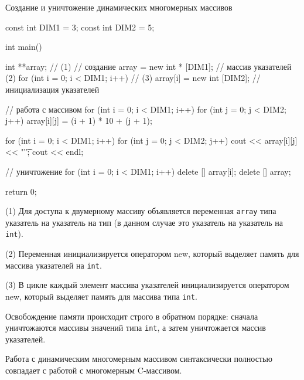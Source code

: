 \documentclass[
    9pt,
    hyperref={pdfencoding=unicode}
    ]{beamer}
\theoremstyle{definition}
\begin{document}
\begin{frame}[fragile]{Создание и уничтожение динамических многомерных массивов}
	\scriptsize 
	\begin{cppcode}
		const int DIM1 = 3;
		const int DIM2 = 5;
		
		int main() {			
			int **array;    // (1)			
			// создание
			array = new int * [DIM1]; // массив указателей (2)
			for (int i = 0; i < DIM1; i++) { // (3)
				array[i] = new int [DIM2]; // инициализация указателей
			}
			
			// работа с массивом
			for (int i = 0; i < DIM1; i++) {
				for (int j = 0; j < DIM2; j++) {
					array[i][j] = (i + 1) * 10 + (j + 1);
				}
			}
			
			for (int i = 0; i < DIM1; i++) {
				for (int j = 0; j < DIM2; j++) {
					cout << array[i][j] << "\t";
				}
				cout << endl;
			}
			
			// уничтожение
			for (int i = 0; i < DIM1; i++) {
				delete [] array[i];
			}
			delete [] array;
			
			return 0;
		}
	\end{cppcode}
\end{frame}

\begin{frame}
	(1) Для доступа к двумерному массиву объявляется переменная \texttt{array} типа указатель на указатель на тип (в данном случае это указатель на указатель на \texttt{int}).
	
	(2) Переменная инициализируется оператором new, который выделяет память для массива указателей на \texttt{int}.
	
	(3) В цикле каждый элемент массива указателей инициализируется оператором new, который выделяет память для массива типа \texttt{int}.
	
	Освобождение памяти происходит строго в обратном порядке: сначала уничтожаются массивы значений типа \texttt{int}, а затем уничтожается массив указателей.
	
	Работа с динамическим многомерным массивом синтаксически полностью совпадает с работой с многомерным C-массивом.
\end{frame}
\end{document}
